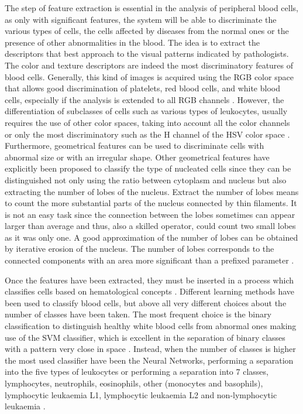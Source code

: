 \documentclass[final,a4paper,12pt,english]{UnicaPhdThesis3}
\begin{document}
The step of feature extraction is essential in the analysis of peripheral blood cells, as only with significant features, the system will be able to discriminate the various types of cells, the cells affected by diseases from the normal ones or the presence of other abnormalities in the blood. The idea is to extract the descriptors that best approach to the visual patterns indicated by pathologists. The color and texture descriptors are indeed the most discriminatory features of blood cells. Generally, this kind of images is acquired using the RGB color space that allows good discrimination of platelets, red blood cells, and white blood cells, especially if the analysis is extended to all RGB channels \cite{Angulo}. However, the differentiation of subclasses of cells such as various types of leukocytes, usually requires the use of other color spaces, taking into account all the color channels or only the most discriminatory such as the H channel of the HSV color space \cite{Hengen}.
Furthermore, geometrical features can be used to discriminate cells with abnormal size or with an irregular shape. Other geometrical features have explicitly been proposed to classify the type of nucleated cells since they can be distinguished not only using the ratio between cytoplasm and nucleus \cite{Piuri, Sco05, Sco06} but also extracting the number of lobes of the nucleus. Extract the number of lobes means to count the more substantial parts of the nucleus connected by thin filaments. It is not an easy task since the connection between the lobes sometimes can appear larger than average and thus, also a skilled operator, could count two small lobes as it was only one. A good approximation of the number of lobes can be obtained by iterative erosion of the nucleus. The number of lobes corresponds to the connected components with an area more significant than a prefixed parameter \cite{Piuri}.  

Once the features have been extracted, they must be inserted in a process which classifies cells based on hematological concepts \cite{Biondi, Serbouti}. Different learning methods have been used to classify blood cells, but above all very different choices about the number of classes have been taken. The most frequent choice is the binary classification to distinguish healthy white blood cells from abnormal ones making use of the SVM classifier, which is excellent in the separation of binary classes with a pattern very close in space \cite{Mohapatra10a, Mohapatra10b, Mohapatra10c, Mohapatra14}. Instead, when the number of classes is higher the most used classifier have been the Neural Networks, performing a separation into the five types of leukocytes \cite{Sco06} or performing a separation into 7 classes, lymphocytes, neutrophils, eosinophils, other (monocytes and basophils), lymphocytic leukaemia L1, lymphocytic leukaemia L2 and non-lymphocytic leukaemia \cite{Buavirat}. 
\end{document}
